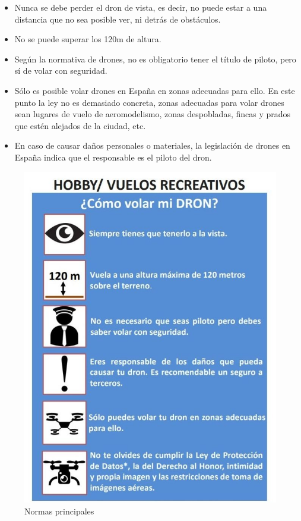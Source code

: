 \begin{itemize}
\item Nunca se debe perder el dron de vista, es decir, no puede estar a una distancia que no sea posible ver, ni detrás de obstáculos.
\item No se puede superar los 120m de altura.
\item Según la normativa de drones, no es obligatorio tener el título de piloto, pero sí de volar con seguridad.
\item Sólo es posible volar drones en España en zonas adecuadas para ello. En este punto la ley no es demasiado concreta, zonas adecuadas para volar drones sean lugares de vuelo de aeromodelismo, zonas despobladas, fincas y prados que estén alejados de la ciudad, etc.
\item En caso de causar daños personales o materiales, la legislación de drones en España indica que el responsable es el piloto del dron.

\end{itemize}
\begin{figure}[H]
  \centering
  \includegraphics[scale=0.3]{imagenes/normas.jpg}
  \caption{Normas principales}
  \label{fig:normas}
\end{figure}

